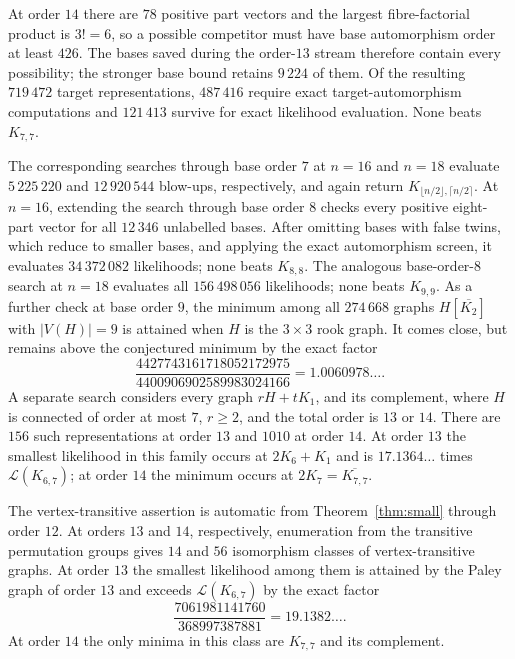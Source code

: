 \documentclass[11pt]{article}
\theoremstyle{definition}
\newcommand{\Lk}{\mathcal{L}}
\newcommand{\Kbal}{K_{\lfloor n/2\rfloor,\lceil n/2\rceil}}
\begin{document}
At order $14$ there are $78$ positive part vectors and the largest
fibre-factorial product is $3!=6$, so a possible competitor must have base
automorphism order at least $426$.  The bases saved during the order-$13$
stream therefore contain every possibility; the stronger base bound retains
$9\,224$ of them.  Of the resulting $719\,472$ target representations,
$487\,416$ require exact target-automorphism computations and $121\,413$
survive for exact likelihood evaluation.  None beats $K_{7,7}$.

The corresponding searches through base order $7$ at $n=16$ and $n=18$
evaluate $5\,225\,220$ and $12\,920\,544$ blow-ups, respectively, and again
return $\Kbal$.
At $n=16$, extending the search through base order $8$ checks every positive
eight-part vector for all $12\,346$ unlabelled bases.  After omitting bases
with false twins, which reduce to smaller bases, and applying the exact
automorphism screen, it evaluates $34\,372\,082$ likelihoods; none beats
$K_{8,8}$.  The analogous base-order-$8$ search at $n=18$ evaluates all
$156\,498\,056$ likelihoods; none beats $K_{9,9}$.
As a further check at base order $9$, the minimum among all $274\,668$ graphs
$H[\overline{K_2}]$ with $\lvert V(H)\rvert=9$ is attained when $H$ is the
$3\times3$ rook graph.  It
comes close, but remains above the conjectured minimum by the exact factor
\[
\frac{4427743161718052172975}{4400906902589983024166}
=1.0060978\ldots.
\]
A separate search considers every graph $rH+tK_1$, and its complement, where
$H$ is connected of order at most $7$, $r\ge2$, and the total order is $13$
or $14$.  There are $156$ such representations at order $13$ and $1010$ at
order $14$.  At order $13$ the smallest likelihood in this family occurs at
$2K_6+K_1$ and is $17.1364\ldots$ times $\Lk(K_{6,7})$; at order $14$ the
minimum occurs at $2K_7=\overline{K_{7,7}}$.

The vertex-transitive assertion is automatic from Theorem~\ref{thm:small}
through order $12$.  At orders $13$ and $14$, respectively, enumeration from
the transitive permutation groups gives $14$ and $56$ isomorphism classes of
vertex-transitive graphs.  At order $13$ the smallest likelihood among them
is attained by the Paley graph of order $13$ and exceeds $\Lk(K_{6,7})$ by
the exact factor
\[
\frac{7061981141760}{368997387881}=19.1382\ldots.
\]
At order $14$ the only minima in this class are $K_{7,7}$ and its complement.
\end{document}
